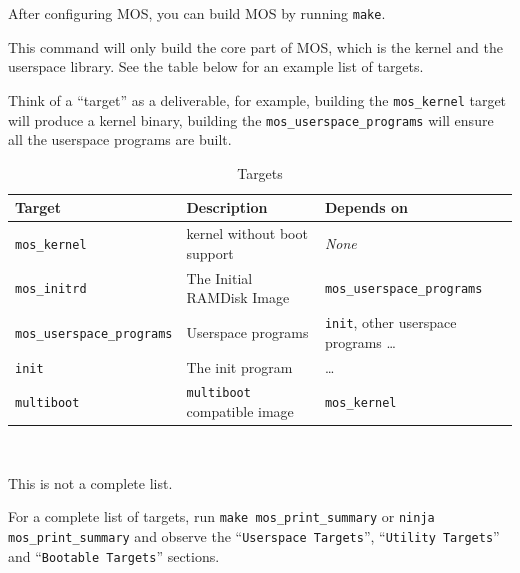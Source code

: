 After configuring MOS, you can build MOS by running \texttt{make}.

This command will only build the core part of MOS, which is the kernel and the userspace library.
See the table below for an example list of targets.

\begin{tip}
    \item Think of a ``target'' as a deliverable, for example, building the \texttt{mos\_kernel} target
    will produce a kernel binary, building the \texttt{mos\_userspace\_programs} will ensure
    all the userspace programs are built.
\end{tip}

\begin{table}[ht]
    \centering
    \small
    \begin{tabular}{|l|l|l|}
        \hline
        \textbf{Target}                   & \textbf{Description}                & \textbf{Depends on}                           \\ \hline
        \texttt{mos\_kernel}              & kernel without boot support         & \textit{None}                                 \\ \hline
        \texttt{mos\_initrd}              & The Initial RAMDisk Image           & \texttt{mos\_userspace\_programs}             \\ \hline
        \texttt{mos\_userspace\_programs} & Userspace programs                  & \texttt{init}, other userspace programs \dots \\ \hline
        \texttt{init}                     & The init program                    & \dots                                         \\ \hline
        \texttt{multiboot}                & \texttt{multiboot} compatible image & \texttt{mos\_kernel}                          \\ \hline
    \end{tabular} \\
    \begin{note}
        \item This is not a complete list.
        \item For a complete list of targets, run \texttt{make mos\_print\_summary} or \texttt{ninja mos\_print\_summary}
        and observe the ``\texttt{Userspace Targets}'', ``\texttt{Utility Targets}'' and ``\texttt{Bootable Targets}'' sections.
    \end{note}
    \caption{Targets}
    \label{tab:targets}
\end{table}

